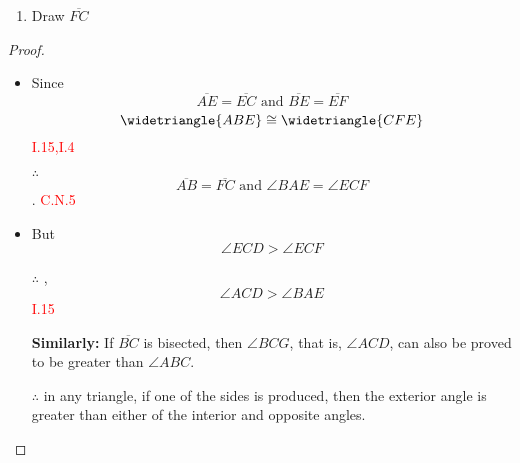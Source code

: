 \begin{enumerate}
\item Draw $\overline{FC}$

\begin{figure}[H]
	\caption{}
\end{figure}

\end{enumerate}

\begin{proof}

\begin{itemize}

\item Since \[\overline{AE} = \overline{EC} \text{ and } \overline{BE} = \overline{EF}\]
\[\widetriangle{ABE} \cong \widetriangle{CFE}\] \hfill\textcolor{red}{ I.15,I.4}

\item[$\therefore$]
 \[\overline{AB} = \overline{FC} \text { and } \angle{BAE} = \angle{ECF}\]. \hfill\textcolor{red}{C.N.5}

\clearpage

\item But 
\[\angle{ECD} > \angle{ECF}\]

\item[$\therefore$], 
\[\angle{ACD} > \angle{BAE}\] \hfill\textcolor{red}{I.15}

\item[\textbf{Similarly:}] If $\overline{BC}$ is bisected, then $\angle{BCG}$, that is, $\angle{ACD}$, can also be proved to be greater than $\angle{ABC}$.

\item[$\therefore$] in any triangle, if one of the sides is produced, then the exterior angle is greater than either of the interior and opposite angles.

\end{itemize}

\end{proof}

\clearpage   
